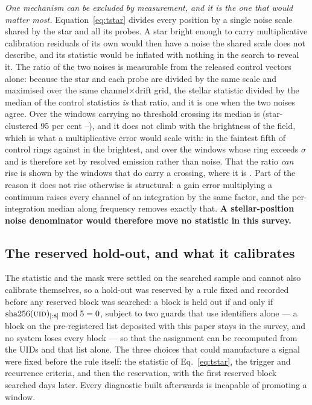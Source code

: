 \emph{One mechanism can be excluded by measurement, and it is the one that
would matter most.} Equation~\ref{eq:tstar} divides every position by a
single noise scale shared by the star and all its probes. A star bright
enough to carry multiplicative calibration residuals of its own would then
have a noise the shared scale does not describe, and its statistic would be
inflated with nothing in the search to reveal it. The ratio of the two noises
is measurable from the released control vectors alone: because the star and
each probe are divided by the same scale and maximised over the same
channel$\times$drift grid, the stellar statistic divided by the median of
the \NCtrl{} control statistics \emph{is} that ratio, and it is one when the
two noises agree. Over the \NsrNWin{} windows carrying no threshold crossing
its median is \NsrMed{} (star-clustered 95 per cent \NsrLo--\NsrHi), and it
does not climb with the brightness of the field, which is what a
multiplicative error would scale with: \NsrFifthLo{} in the faintest fifth of
control rings against \NsrFifthHi{} in the brightest, and \NsrBrightMed{}
over the \NsrBrightN{} windows whose ring exceeds \NsrBrightSig$\sigma$ and
is therefore set by resolved emission rather than noise. That the ratio
\emph{can} rise is shown by the \NsrCrossN{} windows that do carry a
crossing, where it is \NsrCrossMed. Part of the reason it does not rise
otherwise is structural: a gain error multiplying a continuum raises every
channel of an integration by the same factor, and the per-integration median
along frequency removes exactly that. \textbf{A stellar-position noise
denominator would therefore move no statistic in this survey.}

\subsection{The reserved hold-out, and what it calibrates}
\label{sec:heldout}

The statistic and the mask were settled on the searched sample and cannot
also calibrate themselves, so a hold-out was reserved by a rule fixed and
recorded before any reserved block was searched: a block is held out if and
only if $\mathrm{sha256}(\textsc{uid})_{[:8]} \bmod 5 = 0$, subject to two
guards that use identifiers alone --- a block on the pre-registered list
deposited with this paper stays in the survey, and no system loses every
block --- so that the assignment can be recomputed from the UIDs and that
list alone. The three choices that could manufacture a signal were fixed
before the rule itself: the statistic of Eq.~\ref{eq:tstar}, the trigger and
recurrence criteria, and then the reservation, with the first reserved block
searched \HoLeadBlockDays{} days later. Every diagnostic built afterwards is
incapable of promoting a window.

